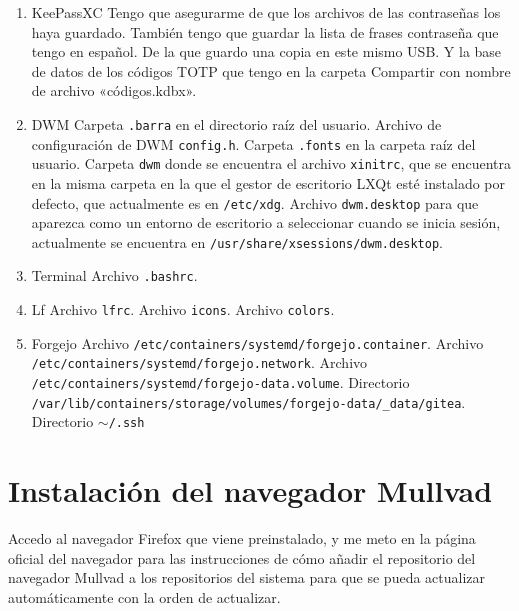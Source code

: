 \documentclass{article}
\begin{document}
\begin{enumerate}
		   usuario.
		   \subitem Archivo \texttt{.vimrc} en la carpeta raíz del
		   usuario.
	   \item KeePassXC
		   \subitem Tengo que asegurarme de que los archivos de las
		   contraseñas los haya guardado.
           \subitem También tengo que guardar la lista de frases contraseña
           que tengo en español. De la que guardo una copia en este mismo
           USB.
           \subitem Y la base de datos de los códigos TOTP que tengo en la carpeta
           Compartir con nombre de archivo «códigos.kdbx».
	   \item DWM
		   \subitem Carpeta \texttt{.barra} en el directorio raíz del
		   usuario.
		   \subitem Archivo de configuración de DWM
		   \texttt{config.h}.
		   \subitem Carpeta \texttt{.fonts} en la carpeta raíz del
		   usuario.
		   \subitem Carpeta \texttt{dwm} donde se encuentra el archivo
		   \texttt{xinitrc}, que se encuentra en la misma carpeta en la
		   que el gestor de escritorio LXQt esté instalado por defecto,
		   que actualmente es en \texttt{/etc/xdg}.
		   \subitem Archivo \texttt{dwm.desktop} para que aparezca como
		   un entorno de escritorio a seleccionar cuando se inicia
		   sesión, actualmente se encuentra en
		   \texttt{/usr/share/xsessions/dwm.desktop}.
	   \item Terminal
		   \subitem Archivo \texttt{.bashrc}.
        \item Lf
            \subitem Archivo \texttt{lfrc}.
            \subitem Archivo \texttt{icons}.
            \subitem Archivo \texttt{colors}.
        \item Forgejo
            \subitem Archivo \texttt{/etc/containers/systemd/forgejo.container}.
            \subitem Archivo \texttt{/etc/containers/systemd/forgejo.network}.
            \subitem Archivo \texttt{/etc/containers/systemd/forgejo-data.volume}.
            \subitem Directorio
	    \texttt{/var/lib/containers/storage/volumes/forgejo-data/\_data/gitea}.
            \subitem Directorio \texttt{$\sim$/.ssh}
    \end{enumerate}

    \section{Instalación del navegador Mullvad}
    Accedo al navegador Firefox que viene preinstalado, y me meto en la página
    oficial del navegador para las instrucciones de cómo añadir el repositorio
    del navegador Mullvad a los repositorios del sistema para que se pueda
    actualizar automáticamente con la orden de actualizar.
\end{document}
